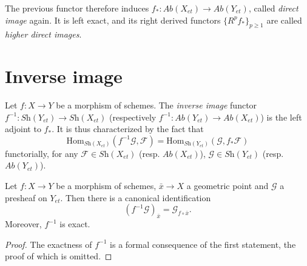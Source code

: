 \begin{definition}
\label{definition-direct-image-sheaf}
The previous functor therefore induces $f_*:\textit{Ab}(X_{et})\to
\textit{Ab}(Y_{et})$, called {\it direct image} again. It is left exact, and its
right derived functors $\{R^pf_*\}_{p \geq 1}$ are called
{\it higher direct images}.
\end{definition}





\section{Inverse image}
\label{section-inverse-image}

\begin{definition}
\label{definition-inverse-image}
Let $f: X\to Y$ be a morphism of schemes. The {\it inverse image} functor
$f^{-1} : \textit{Sh}(Y_{et})\to \textit{Sh}(X_{et})$
(respectively
$f^{-1}: \textit{Ab}(Y_{et}) \to \textit{Ab}(X_{et})$)
is the left adjoint to $f_*$. It is
thus characterized by the fact that
$$
\text{Hom}_{{\textit{Sh}(X_{et})}} (f^{-1}\mathcal{G}, \mathcal{F}) =
\text{Hom}_{\textit{Sh}(Y_{et})} (\mathcal{G}, f_*\mathcal{F})
$$
functorially, for any $\mathcal{F} \in \textit{Sh}(X_{et})$ (resp.
$\textit{Ab}(X_{et})$), $\mathcal{G} \in \textit{Sh}(Y_{et})$ (resp.
$\textit{Ab}(Y_{et})$).
\end{definition}

\begin{lemma}
\label{lemma-stalk-pullback}
Let $f : X \to Y$ be a morphism of schemes, $\bar x \to X$ a geometric point
and $\mathcal{G}$ a presheaf on $Y_{et}$. Then there is a canonical
identification
$$
\left(f^{-1}\mathcal{G}\right)_{\bar x} = \mathcal{G}_{f\circ \bar x}.
$$
Moreover, $f^{-1}$ is exact.
\end{lemma}

\begin{proof}
The exactness of $f^{-1}$ is a formal consequence of the first statement, the
proof of which is omitted.
\end{proof}

